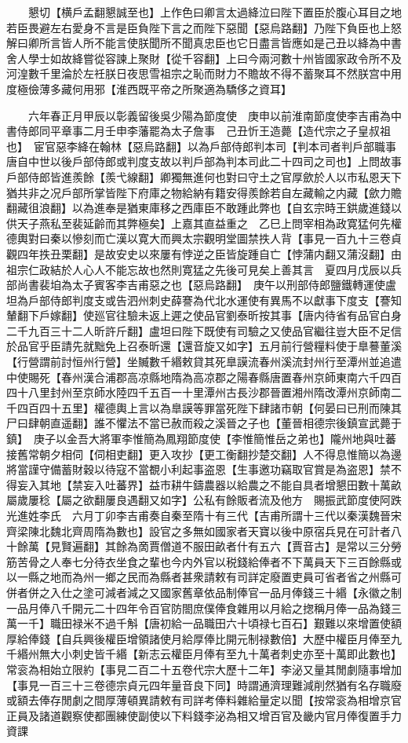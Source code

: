 　　懇切【横戶孟翻懇誠至也】上作色曰卿言太過絳泣曰陛下置臣於腹心耳目之地若臣畏避左右愛身不言是臣負陛下言之而陛下惡聞【惡烏路翻】乃陛下負臣也上怒解曰卿所言皆人所不能言使朕聞所不聞真忠臣也它日盡言皆應如是己丑以絳為中書舍人學士如故絳嘗從容諫上聚財【從千容翻】上曰今兩河數十州皆國家政令所不及河湟數千里淪於左祍朕日夜思雪祖宗之恥而財力不贍故不得不蓄聚耳不然朕宫中用度極儉薄多藏何用邪【淮西既平帝之所聚適為驕侈之資耳】

　　六年春正月甲辰以彰義留後吳少陽為節度使　庚申以前淮南節度使李吉甫為中書侍郎同平章事二月壬申李藩罷為太子詹事　己丑忻王造薨【造代宗之子皇叔祖也】　宦官惡李絳在翰林【惡烏路翻】以為戶部侍郎判本司【判本司者判戶部職事唐自中世以後戶部侍郎或判度支故以判戶部為判本司此二十四司之司也】上問故事戶部侍郎皆進羨餘【羨弋線翻】卿獨無進何也對曰守土之官厚歛於人以市私恩天下猶共非之况戶部所掌皆陛下府庫之物給納有籍安得羨餘若自左藏輸之内藏【歛力贍翻藏徂浪翻】以為進奉是猶東庫移之西庫臣不敢踵此弊也【自玄宗時王鉷歲進錢以供天子燕私至裴延齡而其弊極矣】上嘉其直益重之　乙巳上問宰相為政寛猛何先權德輿對曰秦以慘刻而亡漢以寛大而興太宗觀明堂圖禁抶人背【事見一百九十三卷貞觀四年抶丑栗翻】是故安史以來屢有悖逆之臣皆旋踵自亡【悖蒲内翻又蒲沒翻】由祖宗仁政結於人心人不能忘故也然則寛猛之先後可見矣上善其言　夏四月戊辰以兵部尚書裴垍為太子賓客李吉甫惡之也【惡烏路翻】　庚午以刑部侍郎鹽鐵轉運使盧坦為戶部侍郎判度支或告泗州刺史薛謇為代北水運使有異馬不以獻事下度支【謇知輦翻下戶嫁翻】使廵官往驗未返上遲之使品官劉泰昕按其事【唐内待省有品官白身二千九百三十二人昕許斤翻】盧坦曰陛下既使有司驗之又使品官繼往豈大臣不足信於品官乎臣請先就黜免上召泰昕還【還音旋又如字】五月前行營糧料使于臯謩董溪【行營謂前討恒州行營】坐贓數千緡敕貸其死臯謨流春州溪流封州行至潭州並追遣中使賜死【春州漢合浦郡高凉縣地隋為高凉郡之陽春縣唐置春州京師東南六千四百四十八里封州至京師水陸四千五百一十里潭州古長沙郡晉置湘州隋改潭州京師南二千四百四十五里】權德輿上言以為臯謨等罪當死陛下肆諸市朝【何晏曰已刑而陳其尸曰肆朝直遥翻】誰不懼法不當已赦而殺之溪晉之子也【董晉相德宗後鎮宣武薨于鎮】　庚子以金吾大將軍李惟簡為鳳翔節度使【李惟簡惟岳之弟也】隴州地與吐蕃接舊常朝夕相伺【伺相吏翻】更入攻抄【更工衡翻抄楚交翻】人不得息惟簡以為邊將當謹守備蓄財穀以待寇不當覩小利起事盗恩【生事邀功竊取官賞是為盗恩】禁不得妄入其地【禁妄入吐蕃界】益市耕牛鑄農器以給農之不能自具者增懇田數十萬畝屬歲屢稔【屬之欲翻屢良遇翻又如字】公私有餘販者流及他方　賜振武節度使阿跌光進姓李氏　六月丁卯李吉甫奏自秦至隋十有三代【吉甫所謂十三代以秦漢魏晉宋齊梁陳北魏北齊周隋為數也】設官之多無如國家者天寶以後中原宿兵見在可計者八十餘萬【見賢遍翻】其餘為啇賈僧道不服田畝者什有五六【賈音古】是常以三分勞筋苦骨之人奉七分待衣坐食之輩也今内外官以税錢給俸者不下萬員天下三百餘縣或以一縣之地而為州一鄉之民而為縣者甚衆請敕有司詳定廢置吏員可省者省之州縣可併者併之入仕之塗可減者減之又國家舊章依品制俸官一品月俸錢三十緡【永徽之制一品月俸八千開元二十四年令百官防閤庶僕俸食雜用以月給之揔稱月俸一品為錢三萬一千】職田禄米不過千斛【唐初給一品職田六十頃禄七百石】艱難以來增置使額厚給俸錢【自兵興後權臣增領諸使月給厚俸比開元制禄數倍】大歷中權臣月俸至九千緡州無大小刺史皆千緡【新志云權臣月俸有至九十萬者刺史亦至十萬即此數也】常衮為相始立限約【事見二百二十五卷代宗大歷十二年】李泌又量其閒劇隨事增加【事見一百三十三卷德宗貞元四年量音良下同】時謂通濟理難減削然猶有名存職廢或額去俸存閒劇之間厚薄頓異請敕有司詳考俸料雜給量定以聞【按常衮為相增京官正員及諸道觀察使都團練使副使以下料錢李泌為相又增百官及畿内官月俸復置手力資課